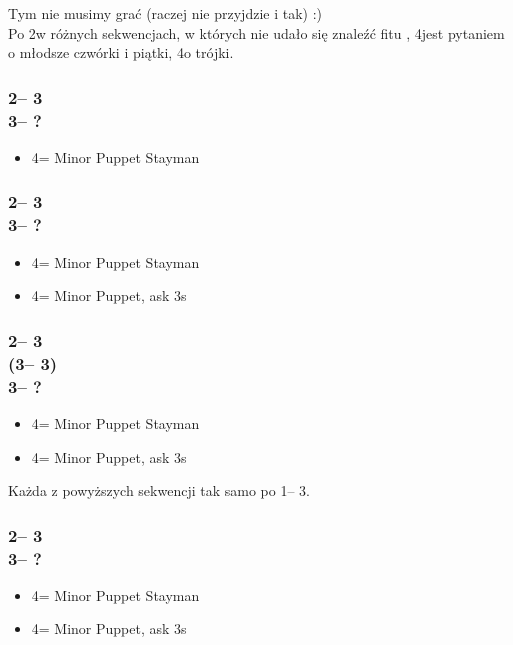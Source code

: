 \documentclass[12pt, a4paper]{report}
\begin{document}
 {
    Tym nie musimy grać (raczej nie przyjdzie i tak) :)\\

    Po 2\nt w różnych sekwencjach, w których nie udało się znaleźć fitu \major,
    4\clubs jest pytaniem o młodsze czwórki i piątki, 4\diams o trójki.

    \subsubsection*{2\nt -- 3\clubs\\
                    3\diams -- ?}
    \begin{itemize}
        \item 4\clubs = Minor Puppet Stayman
    \end{itemize}

    \subsubsection*{2\nt -- 3\clubs\\
                    3\major -- ?}
    \begin{itemize}
        \item 4\clubs = Minor Puppet Stayman
        \item 4\diams = Minor Puppet, ask 3s
    \end{itemize}

    \subsubsection*{2\nt -- 3\clubs\\
                    (3\diams -- 3\major)\\
                    3\nt -- ?}
    \begin{itemize}
        \item 4\clubs = Minor Puppet Stayman
        \item 4\diams = Minor Puppet, ask 3s
    \end{itemize}

    Każda z powyższych sekwencji tak samo po 1\nt -- 3\clubs.

    \subsubsection*{2\nt -- 3\diams\\
                    3\hearts -- ?}
    \begin{itemize}
        \item 4\clubs = Minor Puppet Stayman
        \item 4\diams = Minor Puppet, ask 3s
    \end{itemize}

}
\end{document}
